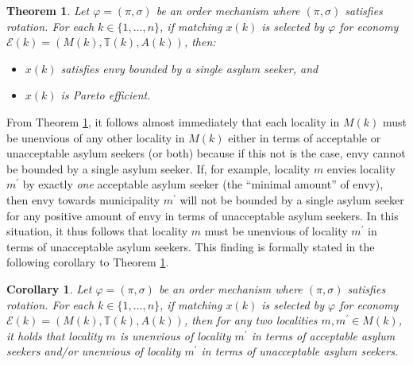 \documentclass[12pt,fleqn]{article}
\newtheorem{theorem}{Theorem}
\newtheorem{corollary}{Corollary}
\begin{document}
\begin{theorem}\rm\label{THEOREM:envy_efficiency}
Let $\varphi=(\pi,\sigma)$ be an order mechanism where $(\pi,\sigma)$ satisfies rotation.
For each $k\in \{1,\ldots,n\}$, if matching $x(k)$ is selected by $\varphi$ for economy $\mathcal{E}(k)=(M(k),\mathbb{T}(k),A(k))$, then:
\begin{itemize}
\item[(i)] $x(k)$ satisfies envy bounded by a single asylum seeker, and
\item[(ii)] $x(k)$ is Pareto efficient.
\end{itemize}
\end{theorem}
\noindent From Theorem \ref{THEOREM:envy_efficiency}, it follows almost immediately that each locality in $M(k)$ must be unenvious of any other locality in $M(k)$ either in terms of acceptable or unacceptable asylum seekers (or both) because if this not is the case, envy cannot be bounded by a single asylum seeker. If, for example, locality $m$ envies locality $m^\prime$ by exactly \emph{one} acceptable asylum seeker (the ``minimal amount'' of envy), then envy towards municipality $m^\prime$ will not be bounded by a single asylum seeker for any positive amount of envy in terms of unacceptable asylum seekers. In this situation, it thus follows that locality $m$ must be unenvious of locality $m^\prime$ in terms of unacceptable asylum seekers. This finding is formally stated in the following corollary to Theorem \ref{THEOREM:envy_efficiency}.
\begin{corollary}\rm\label{COROLLARY:envy}
Let $\varphi=(\pi,\sigma)$ be an order mechanism where $(\pi,\sigma)$ satisfies rotation.
For each $k\in \{1,\ldots,n\}$, if matching $x(k)$ is selected by $\varphi$ for economy $\mathcal{E}(k)=(M(k),\mathbb{T}(k),A(k))$, then for any two localities $m,m^\prime\in M(k)$, it holds that locality $m$ is unenvious of locality $m^\prime$ in terms of acceptable asylum seekers and/or unenvious of locality $m^\prime$ in terms of unacceptable asylum seekers.
\end{corollary}
\end{document}
